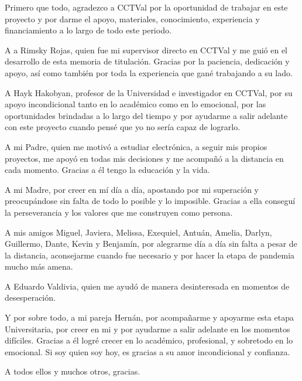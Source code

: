 
Primero que todo, agradezco a CCTVal por la oportunidad de trabajar en este proyecto y por darme el apoyo, materiales, conocimiento, experiencia y financiamiento a lo largo de todo este periodo.

A a Rimsky Rojas, quien fue mi supervisor directo en CCTVal y me guió en el desarrollo de esta memoria de titulación. Gracias por la paciencia, dedicación y apoyo, así como también por toda la experiencia que gané trabajando a su lado.
 
A Hayk Hakobyan, profesor de la Universidad e investigador en CCTVal, por su apoyo incondicional tanto en lo académico como en lo emocional, por las oportunidades brindadas a lo largo del tiempo y por ayudarme a salir adelante con este proyecto cuando pensé que yo no sería capaz de lograrlo.

A mi Padre, quien me motivó a estudiar electrónica, a seguir mis propios proyectos, me apoyó en todas mis decisiones y me acompañó a la distancia en cada momento. Gracias a él tengo la educación y la vida.

A mi Madre, por creer en mí día a día, apostando por mi superación y preocupándose sin falta de todo lo posible y lo imposible. Gracias a ella conseguí la perseverancia y los valores que me construyen como persona.

A mis amigos Miguel, Javiera, Melissa, Exequiel, Antuán,  Amelia, Darlyn, Guillermo, Dante, Kevin y Benjamín, por alegrarme día a día sin falta a pesar de la distancia, aconsejarme cuando fue necesario y por hacer la etapa de pandemia mucho más amena.

A Eduardo Valdivia, quien me ayudó de manera desinteresada en momentos de desesperación.

Y por sobre todo, a mi pareja Hernán, por acompañarme y apoyarme esta etapa Universitaria, por creer en mi y por ayudarme a salir adelante en los momentos difíciles. Gracias a él logré crecer en lo académico, profesional, y sobretodo en lo emocional. Si soy quien soy hoy, es gracias a su amor incondicional y confianza.\\

\begin{flushright}
	A todos ellos y muchos otros, gracias.
\end{flushright}
